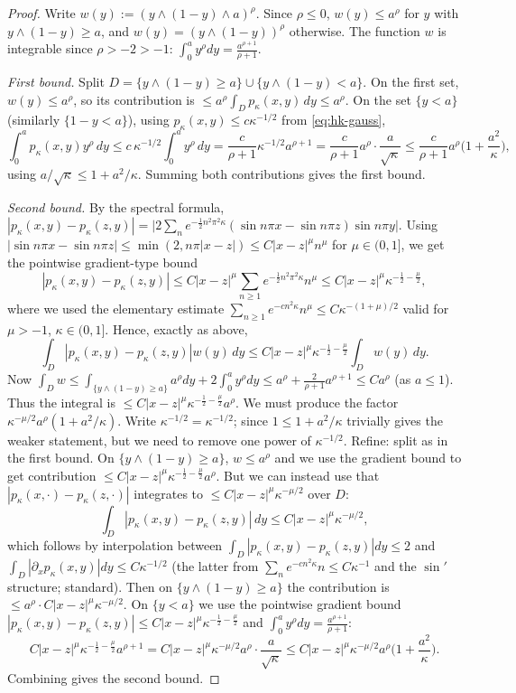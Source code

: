 \begin{proof}
Write $w(y):=(y\wedge(1-y)\wedge a)^\rho$. Since $\rho\le0$, $w(y)\le a^\rho$ for $y$ with $y\wedge(1-y)\ge a$, and $w(y)=(y\wedge(1-y))^\rho$ otherwise. The function $w$ is integrable since $\rho>-2>-1$: $\int_0^a y^\rho dy=\frac{a^{\rho+1}}{\rho+1}$.

\emph{First bound.} Split $D=\{y\wedge(1-y)\ge a\}\cup\{y\wedge(1-y)<a\}$. On the first set, $w(y)\le a^\rho$, so its contribution is $\le a^\rho\int_D p_\kappa(x,y)\,dy\le a^\rho$. On the set $\{y<a\}$ (similarly $\{1-y<a\}$), using $p_\kappa(x,y)\le c\kappa^{-1/2}$ from \eqref{eq:hk-gauss},
\[
\int_0^a p_\kappa(x,y)y^\rho\,dy\le c\,\kappa^{-1/2}\int_0^a y^\rho\,dy=\frac{c}{\rho+1}\kappa^{-1/2}a^{\rho+1}
=\frac{c}{\rho+1}a^\rho\cdot\frac{a}{\sqrt\kappa}\le \frac{c}{\rho+1}a^\rho\Big(1+\frac{a^2}{\kappa}\Big),
\]
using $a/\sqrt\kappa\le 1+a^2/\kappa$. Summing both contributions gives the first bound.

\emph{Second bound.} By the spectral formula, $|p_\kappa(x,y)-p_\kappa(z,y)|=\big|2\sum_n e^{-\frac12 n^2\pi^2\kappa}(\sin n\pi x-\sin n\pi z)\sin n\pi y\big|$. Using $|\sin n\pi x-\sin n\pi z|\le \min(2, n\pi|x-z|)\le C|x-z|^\mu n^\mu$ for $\mu\in(0,1]$, we get the pointwise gradient-type bound
\[
|p_\kappa(x,y)-p_\kappa(z,y)|\le C|x-z|^\mu\sum_{n\ge1}e^{-\frac12 n^2\pi^2\kappa}n^\mu\le C|x-z|^\mu\kappa^{-\frac12-\frac\mu2},
\]
where we used the elementary estimate $\sum_{n\ge1}e^{-cn^2\kappa}n^\mu\le C\kappa^{-(1+\mu)/2}$ valid for $\mu>-1$, $\kappa\in(0,1]$. Hence, exactly as above,
\[
\int_D|p_\kappa(x,y)-p_\kappa(z,y)|w(y)\,dy\le C|x-z|^\mu\kappa^{-\frac12-\frac\mu2}\int_D w(y)\,dy.
\]
Now $\int_D w\le \int_{\{y\wedge(1-y)\ge a\}}a^\rho dy+2\int_0^a y^\rho dy\le a^\rho+\frac{2}{\rho+1}a^{\rho+1}\le C a^\rho$ (as $a\le1$). Thus the integral is $\le C|x-z|^\mu\kappa^{-\frac12-\frac\mu2}a^\rho$. We must produce the factor $\kappa^{-\mu/2}a^\rho(1+a^2/\kappa)$. Write $\kappa^{-1/2}=\kappa^{-1/2}$; since $1\le 1+a^2/\kappa$ trivially gives the weaker statement, but we need to remove one power of $\kappa^{-1/2}$. Refine: split as in the first bound. On $\{y\wedge(1-y)\ge a\}$, $w\le a^\rho$ and we use the gradient bound to get contribution $\le C|x-z|^\mu\kappa^{-\frac12-\frac\mu2}a^\rho$. But we can instead use that $|p_\kappa(x,\cdot)-p_\kappa(z,\cdot)|$ integrates to $\le C|x-z|^\mu\kappa^{-\mu/2}$ over $D$:
\[
\int_D|p_\kappa(x,y)-p_\kappa(z,y)|\,dy\le C|x-z|^\mu\kappa^{-\mu/2},
\]
which follows by interpolation between $\int_D|p_\kappa(x,y)-p_\kappa(z,y)|dy\le 2$ and $\int_D|\partial_x p_\kappa(x,y)|dy\le C\kappa^{-1/2}$ (the latter from $\sum_n e^{-cn^2\kappa}n\le C\kappa^{-1}$ and the $\sin'$ structure; standard). Then on $\{y\wedge(1-y)\ge a\}$ the contribution is $\le a^\rho\cdot C|x-z|^\mu\kappa^{-\mu/2}$. On $\{y<a\}$ we use the pointwise gradient bound $|p_\kappa(x,y)-p_\kappa(z,y)|\le C|x-z|^\mu\kappa^{-\frac12-\frac\mu2}$ and $\int_0^a y^\rho dy=\frac{a^{\rho+1}}{\rho+1}$:
\[
C|x-z|^\mu\kappa^{-\frac12-\frac\mu2}a^{\rho+1}=C|x-z|^\mu\kappa^{-\mu/2}a^\rho\cdot\frac{a}{\sqrt\kappa}\le C|x-z|^\mu\kappa^{-\mu/2}a^\rho\Big(1+\frac{a^2}{\kappa}\Big).
\]
Combining gives the second bound.
\end{proof}

